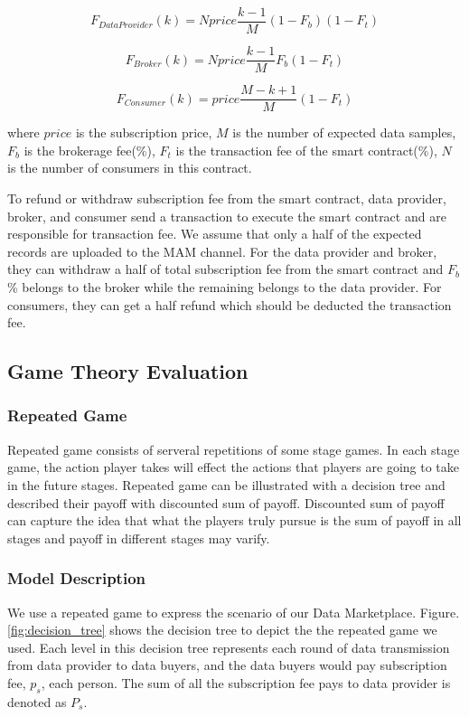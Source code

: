\documentclass[journal,a4paper]{IEEEtran}
\begin{document}
\begin{equation}
F_{DataProvider}(k) = N price \frac{k-1}{M} (1-F_{b}) (1-F_{t})
\end{equation}

\begin{equation}
F_{Broker}(k) = N price \frac{k-1}{M} F_{b} (1-F_{t})
\end{equation}

\begin{equation}
F_{Consumer}(k) = price \frac{M-k+1}{M} (1-F_{t})
\end{equation}

where $price$  is the subscription price, $M$ is the number of expected data samples, $F_{b}$ is the brokerage fee(\%), $F_{t}$ is the transaction fee of the smart contract(\%), $N$ is the number of consumers in this contract.

To refund or withdraw subscription fee from the smart contract, data provider, broker, and consumer send a transaction to execute the smart contract and are responsible for transaction fee. We assume that only a half of the expected records are uploaded to the MAM channel. For the data provider and broker, they can withdraw a half of total subscription fee from the smart contract and $F_{b}$ \% belongs to the broker while the remaining belongs to the data provider. For consumers, they can get a half refund which should be deducted the transaction fee.



\subsection{Game Theory Evaluation}
\subsubsection{Repeated Game}
Repeated game consists of serveral repetitions of some stage games. In each stage game, the action player takes will effect the actions that players are going to take in the future stages. Repeated game can be illustrated with a decision tree and described their payoff with discounted sum of payoff. Discounted sum of payoff can capture the idea that what the players truly pursue is the sum of payoff in all stages and payoff in different stages may varify.

\subsubsection{Model Description}
We use a repeated game to express the scenario of our Data Marketplace. Figure.\ref{fig:decision_tree} shows the decision tree to depict the the repeated game we used. Each level in this decision tree represents each round of data transmission from data provider to data buyers, and the data buyers would pay subscription fee, $p_s$, each person. The sum of all the subscription fee pays to data provider is denoted as $P_s$.
\end{document}
